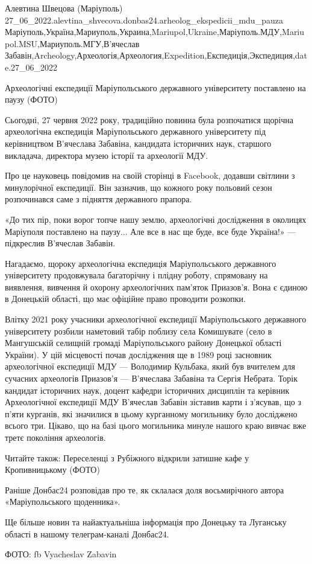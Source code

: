 
 
 
 
 

Алевтина Швецова (Маріуполь)
27_06_2022.alevtina_shvecova.donbas24.arheolog_ekspedicii_mdu_pauza
Маріуполь,Україна,Мариуполь,Украина,Mariupol,Ukraine,Маріуполь.МДУ,Mariupol.MSU,Мариуполь.МГУ,В'ячеслав Забавін,Archeology,Археологія,Археология,Expedition,Експедиція,Экспедиция,date.27_06_2022

Археологічні експедиції Маріупольського державного університету поставлено на
паузу (ФОТО)

Сьогодні, 27 червня 2022 року, традиційно повинна була розпочатися щорічна
археологічна експедиція Маріупольського державного університету під
керівництвом В'ячеслава Забавіна, кандидата історичних наук, старшого
викладача, директора музею історії та археології МДУ.

Про це науковець повідомив на своїй сторінці в Facebook, додавши світлини з
минулорічної експедиції. Він зазначив, що кожного року польовий сезон
розпочинався саме з підняття державного прапора.

«До тих пір, поки ворог топче нашу землю, археологічні дослідження в околицях
Маріуполя поставлено на паузу... Але все в нас ще буде, все буде Україна!» —
підкреслив В'ячеслав Забавін.

Нагадаємо, щороку археологічна експедиція Маріупольського державного
університету продовжувала багаторічну і плідну роботу, спрямовану на виявлення,
вивчення й охорону археологічних пам'яток Приазов'я. Вона є єдиною в Донецькій
області, що має офіційне право проводити розкопки.

Влітку 2021 року учасники археологічної експедиції Маріупольського державного
університету розбили наметовий табір поблизу села Комишувате (село в
Мангушській селищній громаді Маріупольського району Донецької області України).
У цій місцевості почав дослідження ще в 1989 році засновник археологічної
експедиції МДУ — Володимир Кульбака, який був вчителем для сучасних археологів
Приазов'я — В'ячеслава Забавіна та Сергія Небрата. Торік кандидат історичних
наук, доцент кафедри історичних дисциплін та керівник Археологічної експедиції
МДУ В'ячеслав Забавін зіставив карти і з'ясував, що з п'яти курганів, які
значилися в цьому курганному могильнику було досліджено всього три. Цікаво, що
на базі цього могильника минуле нашого краю вивчає вже третє покоління
археологів.

Читайте також: Переселенці з Рубіжного відкрили затишне кафе у Кропивницькому
(ФОТО)

Раніше Донбас24 розповідав про те, як склалася доля восьмирічного автора
«Маріупольського щоденника».

Ще більше новин та найактуальніша інформація про Донецьку та Луганську області
в нашому телеграм-каналі Донбас24.

ФОТО: fb Vyacheslav Zabavin
